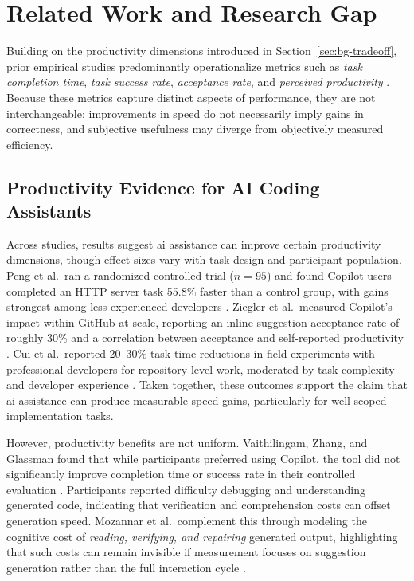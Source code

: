 \chapter{Related Work and Research Gap}

\label{chap:related-work}

Building on the productivity dimensions introduced in Section~\ref{sec:bg-tradeoff}, prior empirical studies predominantly operationalize metrics such as \emph{task completion time}, \emph{task success rate}, \emph{acceptance rate}, and \emph{perceived productivity} \parencite[pp.~55--58]{ziegler2024measuring, peng2023copilot, vaithilingam2022expectation}. Because these metrics capture distinct aspects of performance, they are not interchangeable: improvements in speed do not necessarily imply gains in correctness, and subjective usefulness may diverge from objectively measured efficiency.

\section{Productivity Evidence for AI Coding Assistants}

\label{sec:rw-productivity}

Across studies, results suggest \gls{ai} assistance can improve certain productivity dimensions, though effect sizes vary with task design and participant population. Peng et al.\ ran a randomized controlled trial ($n=95$) and found Copilot users completed an HTTP server task 55.8\% faster than a control group, with gains strongest among less experienced developers \parencite{peng2023copilot}. Ziegler et al.\ measured Copilot’s impact within GitHub at scale, reporting an inline-suggestion acceptance rate of roughly 30\% and a correlation between acceptance and self-reported productivity \parencite[pp.~57--59]{ziegler2024measuring}. Cui et al.\ reported 20--30\% task-time reductions in field experiments with professional developers for repository-level work, moderated by task complexity and developer experience \parencite{cui2025effectsgenai}. Taken together, these outcomes support the claim that \gls{ai} assistance can produce measurable speed gains, particularly for well-scoped implementation tasks.

However, productivity benefits are not uniform. Vaithilingam, Zhang, and Glassman found that while participants preferred using Copilot, the tool did not significantly improve completion time or success rate in their controlled evaluation \parencite{vaithilingam2022expectation}. Participants reported difficulty debugging and understanding generated code, indicating that verification and comprehension costs can offset generation speed. Mozannar et al.\ complement this through modeling the cognitive cost of \emph{reading, verifying, and repairing} generated output, highlighting that such costs can remain invisible if measurement focuses on suggestion generation rather than the full interaction cycle \parencite{mozannar2024reading}.

